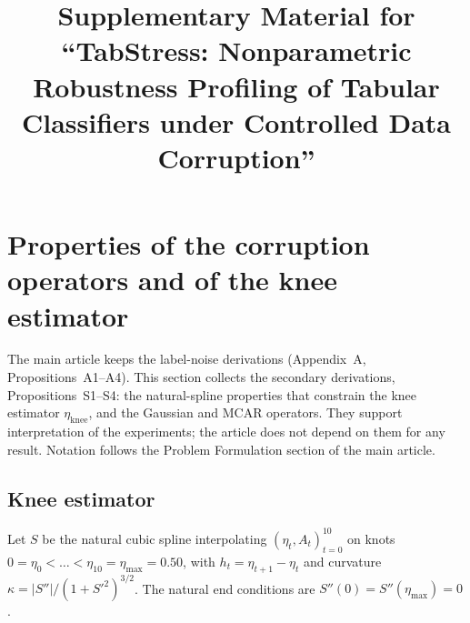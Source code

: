\documentclass[pdflatex,sn-mathphys]{sn-jnl}
\newcommand{\etamax}{\eta_{\max}}
\newcommand{\etaknee}{\eta_{\mathrm{knee}}}
\theoremstyle{thmstyleone}
\begin{document}
\title[Supplementary Material for TabStress]{Supplementary Material for ``TabStress: Nonparametric Robustness Profiling of Tabular Classifiers under Controlled Data Corruption''}
\author*[1]{ }
\author[1]{ }

\maketitle

\section{Properties of the corruption operators and of the knee estimator}\label{sup:props}
The main article keeps the label-noise derivations (Appendix~A, Propositions~A1--A4). This section collects the secondary derivations, Propositions~S1--S4: the natural-spline properties that constrain the knee estimator $\etaknee$, and the Gaussian and MCAR operators. They support interpretation of the experiments; the article does not depend on them for any result. Notation follows the Problem Formulation section of the main article.

\subsection{Knee estimator}
Let $S$ be the natural cubic spline interpolating $(\eta_t,A_t)_{t=0}^{10}$ on knots $0=\eta_0<\dots<\eta_{10}=\etamax=0.50$, with $h_t=\eta_{t+1}-\eta_t$ and curvature $\kappa=\lvert S''\rvert/(1+S'^{2})^{3/2}$. The natural end conditions are $S''(0)=S''(\etamax)=0$.
\end{document}
